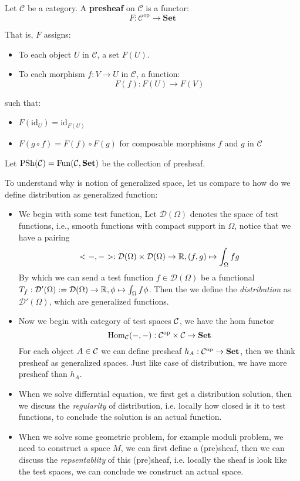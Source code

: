 \begin{definition}[Presheaf]
  Let $\mathcal{C}$ be a category. A \textbf{presheaf} on $\mathcal{C}$ is a functor:
\[
F: \mathcal{C}^{\mathrm{op}} \to \mathbf{Set}
\]

That is, $F$ assigns:
\begin{itemize}
    \item To each object $U$ in $\mathcal{C}$, a set $F(U)$.
    \item To each morphism $f: V \to U$ in $\mathcal{C}$, a function:
    \[
    F(f): F(U) \to F(V)
    \]
\end{itemize}

such that:
\begin{itemize}
    \item $F(\mathrm{id}_U) = \mathrm{id}_{F(U)}$
    \item $F(g \circ f) = F(f) \circ F(g)$ for composable morphisms $f$ and $g$ in $\mathcal{C}$
\end{itemize}
\end{definition}
\begin{remark}
 Let $\mathrm{PSh}(\mathcal{C})=\mathrm{Fun}(\mathcal{C},\mathbf{Set})$ be the collection of presheaf.

To understand why is notion of generalized space, let us compare to how do we define distribution as generalized function: 
\begin{itemize}
  \item We begin with some test function, Let $\mathcal{D}(\Omega)$ denotes the space of test functions, i.e., smooth functions with compact support in $\Omega$, notice that we have a pairing 
    $$ <-,->:\mathcal{D}(\Omega)\times \mathcal{D}(\Omega)\to \mathbb{R}, (f,g) \mapsto \int_\Omega fg $$
    By which we can send a test function $f\in \mathcal{D}(\Omega)$ be a functional $ T_f :\mathcal{D}'(\Omega):=\mathcal{D}(\Omega)\to \mathbb{R}, \phi \mapsto \int_\Omega f\phi $. Then the we define the \emph{distribution} as $ \mathcal{D}'(\Omega)$, which are generalized functions.
  \item Now we begin with category of test spaces $\mathcal{C}$, we have the hom functor 
    \[
      \mathrm{Hom}_{\mathcal{C}}(-,-):\mathcal{C}^{\mathrm{op}} \times \mathcal{C} \to \mathbf{Set}
    \]
    For each object $A\in \mathcal{C}$ we can define presheaf $h_A: \mathcal{C}^{\mathrm{op}}  \to \mathbf{Set}$, then we think presheaf as generalized spaces. Just like case of distribution, we have more presheaf than $h_A$.
  \item When we solve differntial equation, we first get a distribution solution, then we discuss the \emph{regularity} of distribution, i.e. locally how closed is it to test functions, to conclude the solution is an actual function.
  \item When we solve some geometric problem, for example moduli problem, we need to construct a space $M$, we can first define a (pre)sheaf, then we can discuss the \emph{repsentablity} of this (pre)sheaf, i.e. locally the sheaf is look like the test spaces, we can conclude we construct an actual space.
\end{itemize}

\end{remark}
